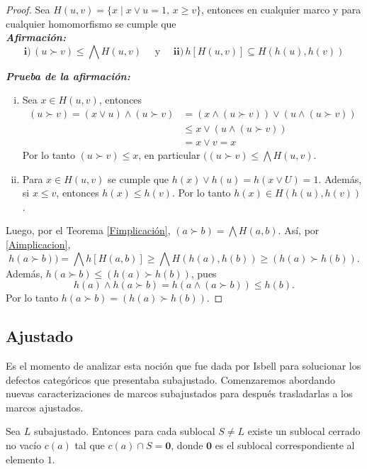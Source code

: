 \begin{proof}
    Sea $H(u, v)=\{x\mid x\vee u=1,\, x\geq v\}$, entonces en cualquier marco y para cualquier homomorfismo se cumple que\\

    \noindent
    \emph{\textbf{Afirmación:}}
    \begin{equation}\label{Aimplicacion}
    \mathbf{ i) }\,(u\succ v)\leq \bigwedge H(u, v)\quad \mbox{ y }\quad \mathbf{ ii) }\,h[H(u, v)]\subseteq H(h(u), h(v))
    \end{equation}

    \noindent
    \emph{\textbf{Prueba de la afirmación:}} 
    \begin{enumerate}[i)]
        \item Sea $x\in H(u, v)$, entonces 
    \[
    \begin{split}
    (u\succ v)=(x\vee u)\wedge (u\succ v) & =(x\wedge (u\succ v))\vee (u\wedge (u\succ v))\\
    & \leq x\vee (u\wedge (u\succ v))\\
    & =x\vee v=x
    \end{split}
    \]
    Por lo tanto $(u\succ v)\leq x$, en particular $((u\succ v)\leq \bigwedge H(u, v)$.
    \item Para $x\in H(u, v)$ se cumple que $h(x)\vee h(u)=h(x\vee U)=1$. Además, si $x\leq v$, entonces $h(x)\leq h(v)$. Por lo tanto $h(x)\in H(h(u), h(v))$.
    \end{enumerate}
    Luego, por el Teorema \ref{Fimplicación}, $(a\succ b)=\bigwedge H(a, b)$. Así, por \ref{Aimplicacion},
    \[
    h(a\succ b))=\bigwedge h[H(a, b)]\geq \bigwedge H(h(a), h(b))\geq (h(a)\succ h(b)).
    \]
    Además, $h(a\succ b)\leq (h(a)\succ h(b))$, pues 
    \[
    h(a)\wedge h(a\succ b)=h(a\wedge (a\succ b))\leq h(b).
    \]
    Por lo tanto $h(a\succ b)=(h(a)\succ h(b))$.
\end{proof}

\subsection{Ajustado}

Es el momento de analizar esta noción que fue dada por Isbell para solucionar los defectos categóricos que presentaba subajustado. Comenzaremos abordando nuevas caracterizaciones de marcos subajustados para después trasladarlas a los marcos ajustados.

\begin{prop}\label{Cerradosaju}
    Sea $L$ subajustado. Entonces para cada sublocal $S\neq L$ existe un sublocal cerrado no vacío $c(a)$ tal que $c(a)\cap S=\mathbf{0}$, donde $\mathbf{0}$ es el sublocal correspondiente al elemento $1$.
\end{prop}


